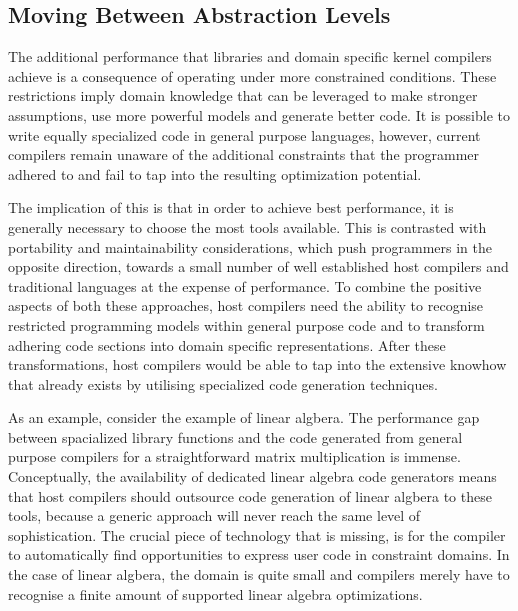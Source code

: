 \subsection*{Moving Between Abstraction Levels}

    The additional performance that libraries and domain specific kernel
    compilers achieve is a consequence of operating under more constrained
    conditions.
    These restrictions imply domain knowledge that can be leveraged to make
    stronger assumptions, use more powerful models and generate better code.
    It is possible to write equally specialized code in general purpose
    languages, however, current compilers remain unaware of the additional
    constraints that the programmer adhered to and fail to tap into the
    resulting optimization potential.

    The implication of this is that in order to achieve best performance, it is
    generally necessary to choose the most tools available.
    This is contrasted with portability and maintainability considerations,
    which push programmers in the opposite direction, towards a small number of
    well established host compilers and traditional languages at the expense of
    performance.
    To combine the positive aspects of both these approaches, host compilers
    need the ability to recognise restricted programming models within general
    purpose code and to transform adhering code sections into domain specific
    representations.
    After these transformations, host compilers would be able to tap into the
    extensive knowhow that already exists by utilising specialized code
    generation techniques.

    As an example, consider the example of linear algbera.
    The performance gap between spacialized library functions and the code
    generated from general purpose compilers for a straightforward matrix
    multiplication is immense.
    Conceptually, the availability of dedicated linear algebra code generators
    means that host compilers should outsource code generation of linear algbera
    to these tools, because a generic approach will never reach the same level
    of sophistication.
    The crucial piece of technology that is missing, is for the compiler to
    automatically find opportunities to express user code in constraint
    domains.
    In the case of linear algbera, the domain is quite small and compilers
    merely have to recognise a finite amount of supported linear algebra
    optimizations.

